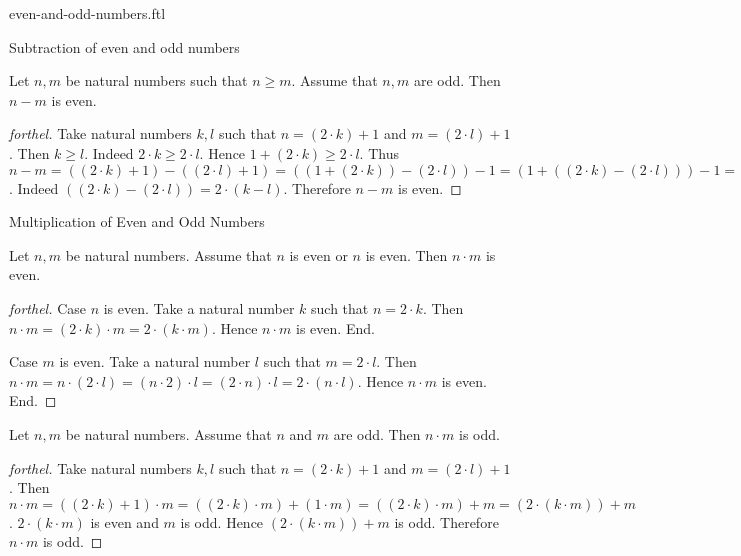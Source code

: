 \documentclass{naproche-library}
\begin{document}
\begin{smodule}[title=Even and Odd Numbers]{even-and-odd-numbers.ftl}
\begin{sfragment}{Subtraction of even and odd numbers}
  \begin{proposition}[forthel,id=ARITHMETIC_15_0125478854587412]
    Let $n, m$ be natural numbers such that $n \geq m$.
    Assume that $n, m$ are odd.
    Then $n - m$ is even.
  \end{proposition}
  \begin{proof}[forthel]
    Take natural numbers $k, l$ such that $n = (2 \cdot k) + 1$ and $m = (2 \cdot l) + 1$.
    Then $k \geq l$.
    Indeed $2 \cdot k \geq 2 \cdot l$.
    Hence $1 + (2 \cdot k) \geq 2 \cdot l$.
    Thus $n - m
      = ((2 \cdot k) + 1) - ((2 \cdot l) + 1)
      = ((1 + (2 \cdot k)) - (2 \cdot l)) - 1
      = (1 + ((2 \cdot k) - (2 \cdot l))) - 1
      = (1 + (2 \cdot (k - l))) - 1
      = ((2 \cdot (k - l)) + 1) - 1
      = 2 \cdot (k - l)$.
    Indeed $((2 \cdot k) - (2 \cdot l)) = 2 \cdot (k - l)$. %
    Therefore $n - m$ is even.
  \end{proof}
\end{sfragment}

\begin{sfragment}{Multiplication of Even and Odd Numbers}
  \begin{proposition}[forthel,id=ARITHMETIC_15_0125698547589652]
    Let $n, m$ be natural numbers.
    Assume that $n$ is even or $n$ is even.
    Then $n \cdot m$ is even.
  \end{proposition}
  \begin{proof}[forthel]
    Case $n$ is even.
      Take a natural number $k$ such that $n = 2 \cdot k$.
      Then $n \cdot m
        = (2 \cdot k) \cdot m
        = 2 \cdot (k \cdot m)$.
      Hence $n \cdot m$ is even.
    End.

    Case $m$ is even.
      Take a natural number $l$ such that $m = 2 \cdot l$.
      Then $n \cdot m
        = n \cdot (2 \cdot l)
        = (n \cdot 2) \cdot l
        = (2 \cdot n) \cdot l
        = 2 \cdot (n \cdot l)$.
      Hence $n \cdot m$ is even.
    End.
  \end{proof}

  \begin{proposition}[forthel,id=ARITHMETIC_15_0236596587452145]
    Let $n, m$ be natural numbers.
    Assume that $n$ and $m$ are odd.
    Then $n \cdot m$ is odd.
  \end{proposition}
  \begin{proof}[forthel]
    Take natural numbers $k, l$ such that $n = (2 \cdot k) + 1$ and $m = (2 \cdot l) + 1$.
    Then $n \cdot m
      = ((2 \cdot k) + 1) \cdot m
      = ((2 \cdot k) \cdot m) + (1 \cdot m)
      = ((2 \cdot k) \cdot m) + m
      = (2 \cdot (k \cdot m)) + m$.
    $2 \cdot (k \cdot m)$ is even and $m$ is odd.
    Hence $(2 \cdot (k \cdot m)) + m$ is odd.
    Therefore $n \cdot m$ is odd.
  \end{proof}
\end{sfragment}
\end{smodule}
\end{document}
